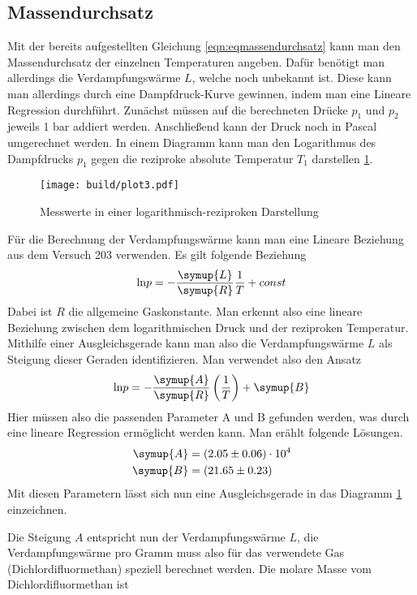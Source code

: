 \subsection{Massendurchsatz}
Mit der bereits aufgestellten Gleichung \eqref{eqn:eqmassendurchsatz} kann man den Massendurchsatz der einzelnen Temperaturen angeben.
Dafür benötigt man allerdings die Verdampfungswärme $L$, welche noch unbekannt ist. Diese kann man allerdings durch eine Dampfdruck-Kurve gewinnen, indem man eine Lineare Regression durchführt.
Zunächst müssen auf die berechneten Drücke $p_{1}$ und $p_{2}$ jeweils 1 bar addiert werden. Anschließend kann der Druck noch in Pascal umgerechnet werden. In einem Diagramm kann man den Logarithmus des Dampfdrucks $p_{1}$ gegen die reziproke absolute Temperatur $T_{1}$ darstellen \ref{fig:plot3}.
\begin{figure}[h]
  \centering
  \texttt{[image: build/plot3.pdf]}
  \caption{Messwerte in einer logarithmisch-reziproken Darstellung}
  \label{fig:plot3}
\end{figure}
Für die Berechnung der Verdampfungswärme kann man eine Lineare Beziehung aus dem Versuch 203 verwenden. Es gilt folgende Beziehung
\begin{equation}
\text{ln} p = - \frac{\symup{L}}{\symup{R}} \frac{1}{T} + const
\end{equation}
Dabei ist $R$ die allgemeine Gaskonstante. Man erkennt also eine lineare Beziehung zwischen dem logarithmischen Druck und der reziproken Temperatur.
Mithilfe einer Ausgleichsgerade kann man also die Verdampfungswärme $L$ als Steigung dieser Geraden identifizieren.
Man verwendet also den Ansatz
\begin{equation}
\text{ln} p = - \frac{\symup{A}}{\symup{R}} \left( \frac{1}{T} \right) + \symup{B} 
\end{equation}
Hier müssen also die passenden Parameter A und B gefunden werden, was durch eine lineare Regression ermöglicht werden kann.
Man erählt folgende Lösungen.
\begin{align}
\symup{A} &= (2.05\pm0.06)\cdot 10^{4} \\
\symup{B} &= (21.65\pm0.23)
\end{align}
Mit diesen Parametern lässt sich nun eine Ausgleichsgerade in das Diagramm \ref{fig:plot3} einzeichnen.
\newpage
\begin{flushleft}
Die Steigung $A$ entspricht nun der Verdampfungswärme $L$, die Verdampfungswärme pro Gramm muss also für das verwendete Gas (Dichlordifluormethan) speziell berechnet werden.
Die molare Masse vom Dichlordifluormethan ist
\end{flushleft}
